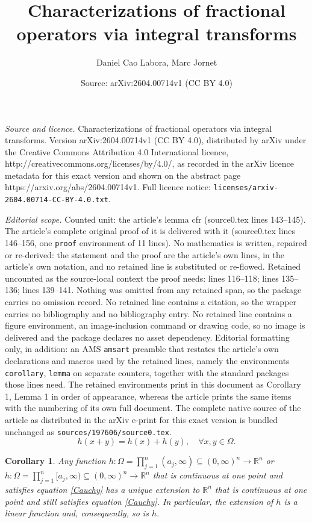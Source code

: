 \documentclass[10pt,a4paper]{amsart}
\title{Characterizations of fractional operators via integral transforms}
\author{Daniel Cao Labora, Marc Jornet}
\date{Source: arXiv:2604.00714v1 (CC BY 4.0)}
\newtheorem{corollary}{Corollary}
\begin{document}
\maketitle

\noindent\emph{Source and licence.} Characterizations of fractional operators via integral transforms. Version arXiv:2604.00714v1 (CC BY 4.0), distributed by arXiv under the Creative Commons Attribution 4.0 International licence, http://creativecommons.org/licenses/by/4.0/, as recorded in the arXiv licence metadata for this exact version and shown on the abstract page https://arxiv.org/abs/2604.00714v1. Full licence notice: \texttt{licenses/arxiv-2604.00714-CC-BY-4.0.txt}.\par\smallskip

\noindent\textit{Editorial scope.} Counted unit: the article's lemma cfr (source0.tex lines 143--145). The article's complete original proof of it is delivered with it (source0.tex lines 146--156, one \texttt{proof} environment of 11 lines). No mathematics is written, repaired or re-derived: the statement and the proof are the article's own lines, in the article's own notation, and no retained line is substituted or re-flowed.  Retained uncounted as the source-local context the proof needs: lines 116--118; lines 135--136; lines 139--141.  Nothing was omitted from any retained span, so the package carries no omission record.  No retained line contains a citation, so the wrapper carries no bibliography and no bibliography entry.  No retained line contains a figure environment, an image-inclusion command or drawing code, so no image is delivered and the package declares no asset dependency.  Editorial formatting only, in addition: an AMS \texttt{amsart} preamble that restates the article's own declarations and macros used by the retained lines, namely the environments \texttt{corollary}, \texttt{lemma} on separate counters, together with the standard packages those lines need.  The retained environments print in this document as Corollary 1, Lemma 1 in order of appearance, whereas the article prints the same items with the numbering of its own full document.  The complete native source of the article as distributed in the arXiv e-print for this exact version is bundled unchanged as \texttt{sources/197606/source0.tex}.
\begin{equation} \label{Cauchy}
    h(x+y)=h(x)+h(y), \quad \forall x,y \in \Omega.
\end{equation}

\begin{corollary} \label{linear} Any function $h: \Omega=\prod_{j=1}^n (a_j,\infty) \subseteq (0,\infty)^n \to \mathbb{R}^n$ or $h: \Omega=\prod_{j=1}^n [a_j,\infty) \subseteq (0,\infty)^n \to \mathbb{R}^n$ that is continuous at one point and satisfies equation \eqref{Cauchy} has a unique extension to $\mathbb{R}^n$ that is continuous at one point and still satisfies equation \eqref{Cauchy}. In particular, the extension of $h$ is a linear function and, consequently, so is $h$.
\end{corollary}
\end{document}
